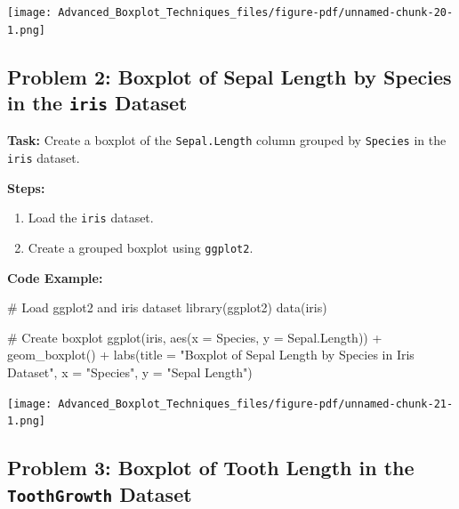 \documentclass[
  letterpaper,
  DIV=11,
  numbers=noendperiod]{scrreprt}
\newenvironment{Shaded}{\begin{snugshade}}{\end{snugshade}}
\newcommand{\AttributeTok}[1]{\textcolor[rgb]{0.40,0.45,0.13}{#1}}
\newcommand{\CommentTok}[1]{\textcolor[rgb]{0.37,0.37,0.37}{#1}}
\newcommand{\FunctionTok}[1]{\textcolor[rgb]{0.28,0.35,0.67}{#1}}
\newcommand{\NormalTok}[1]{\textcolor[rgb]{0.00,0.23,0.31}{#1}}
\newcommand{\SpecialCharTok}[1]{\textcolor[rgb]{0.37,0.37,0.37}{#1}}
\newcommand{\StringTok}[1]{\textcolor[rgb]{0.13,0.47,0.30}{#1}}
\providecommand{\tightlist}{%
  \setlength{\itemsep}{0pt}\setlength{\parskip}{0pt}}\usepackage{longtable,booktabs,array}
\begin{document}
\texttt{[image: Advanced\_Boxplot\_Techniques\_files/figure-pdf/unnamed-chunk-20-1.png]}

\subsection*{\texorpdfstring{Problem 2: Boxplot of Sepal Length by
Species in the \texttt{iris}
Dataset}{Problem 2: Boxplot of Sepal Length by Species in the iris Dataset}}\label{problem-2-boxplot-of-sepal-length-by-species-in-the-iris-dataset}

\textbf{Task:} Create a boxplot of the \texttt{Sepal.Length} column
grouped by \texttt{Species} in the \texttt{iris} dataset.

\textbf{Steps:}

\begin{enumerate}
\def\labelenumi{\arabic{enumi}.}
\tightlist
\item
  Load the \texttt{iris} dataset.
\item
  Create a grouped boxplot using \texttt{ggplot2}.
\end{enumerate}

\textbf{Code Example:}

\begin{Shaded}
\begin{Highlighting}[]
\CommentTok{\# Load ggplot2 and iris dataset}
\FunctionTok{library}\NormalTok{(ggplot2)}
\FunctionTok{data}\NormalTok{(iris)}

\CommentTok{\# Create boxplot}
\FunctionTok{ggplot}\NormalTok{(iris, }\FunctionTok{aes}\NormalTok{(}\AttributeTok{x =}\NormalTok{ Species, }\AttributeTok{y =}\NormalTok{ Sepal.Length)) }\SpecialCharTok{+}
  \FunctionTok{geom\_boxplot}\NormalTok{() }\SpecialCharTok{+}
  \FunctionTok{labs}\NormalTok{(}\AttributeTok{title =} \StringTok{"Boxplot of Sepal Length by Species in Iris Dataset"}\NormalTok{, }\AttributeTok{x =} \StringTok{"Species"}\NormalTok{, }\AttributeTok{y =} \StringTok{"Sepal Length"}\NormalTok{)}
\end{Highlighting}
\end{Shaded}

\texttt{[image: Advanced\_Boxplot\_Techniques\_files/figure-pdf/unnamed-chunk-21-1.png]}

\subsection*{\texorpdfstring{Problem 3: Boxplot of Tooth Length in the
\texttt{ToothGrowth}
Dataset}{Problem 3: Boxplot of Tooth Length in the ToothGrowth Dataset}}\label{problem-3-boxplot-of-tooth-length-in-the-toothgrowth-dataset}
\end{document}
